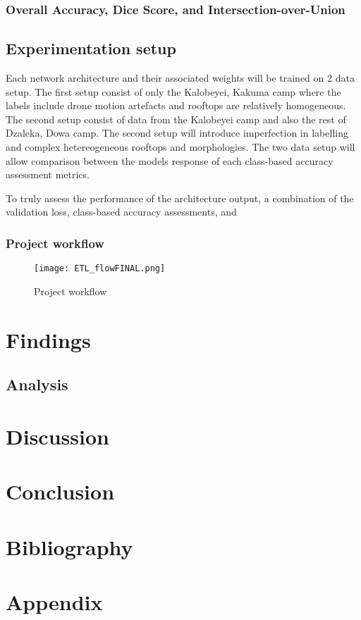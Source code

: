 \documentclass[11pt, a4paper, twoside]{report}
\begin{document}
\subsection{Overall Accuracy, Dice Score, and Intersection-over-Union}\label{2ndorder}
\section{Experimentation setup}\label{ExpSetup}

Each network architecture and their associated weights will be trained on 2 data setup. The first setup consist of only the Kalobeyei, Kakuma camp where the labels include drone motion artefacts and rooftops are relatively homogeneous. The second setup consist of data from the Kalobeyei camp and also the rest of Dzaleka, Dowa camp. The second setup will introduce imperfection in labelling and complex hetereogeneous rooftops and morphologies. The two data setup will allow comparison between the models response of each class-based accuracy assessment metrics.\\\par

To truly assess the performance of the architecture output, a combination of the validation loss, class-based accuracy assessments, and

\subsection{Project workflow}\label{ProjWorkflow}

\begin{figure}[H]
  \centering
  \texttt{[image: ETL\_flowFINAL.png]}
  \caption{Project workflow}
  \label{fig:ETL_flow}
\end{figure}


\newpage

\chapter{Findings}\label{findings}
\section{Analysis}\label{analysis}

\newpage

\chapter{Discussion}\label{Discuss}

\newpage

\chapter{Conclusion}\label{Conclude}

\newpage

\chapter{Bibliography}\label{Bib}

\newpage

\appendix

\chapter{Appendix}\label{Appen}
\newpage
\end{document}
